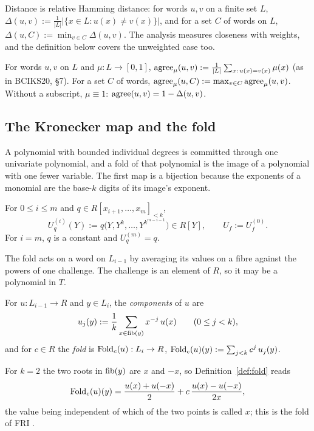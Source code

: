 Distance is relative Hamming distance: for words $u,v$ on a finite set $L$,
$\Delta(u,v):=\frac1{|L|}|\{x\in L:u(x)\ne v(x)\}|$, and for a set $C$ of words on $L$,
$\Delta(u,C):=\min_{v\in C}\Delta(u,v)$. The analysis measures closeness with weights, and the
definition below covers the unweighted case too.

{\sloppy
\begin{definition}\label{def:agree}
For words $u,v$ on $L$ and $\mu:L\to[0,1]$,
$\mathrm{agree}_\mu(u,v):=\frac1{|L|}\sum_{x:\,u(x)=v(x)}\mu(x)$ (as in BCIKS20, \S7). For a set
$C$ of words, $\mathrm{agree}_\mu(u,C):=\max_{v\in C}\mathrm{agree}_\mu(u,v)$. Without a subscript,
$\mu\equiv1$: $\mathrm{agree}(u,v)=1-\Delta(u,v)$.
\end{definition}\par}

\subsection{The Kronecker map and the fold}\label{sec:kron-prelim}

A polynomial with bounded individual degrees is committed through one univariate polynomial,
and a fold of that polynomial is the image of a polynomial with one fewer variable. The
first map is a bijection because the exponents of a monomial are the base-$k$ digits of its
image's exponent.

\begin{definition}\label{def:kron}
For $0\le i\le m$ and $q\in R[x_{i+1},\dots,x_m]_{<k}$,
\[
U^{(i)}_q(Y):=q\big(Y,Y^{k},\dots,Y^{k^{m-i-1}}\big)\in R[Y],\qquad U_f:=U^{(0)}_f .
\]
For $i=m$, $q$ is a constant and $U^{(m)}_q=q$.
\end{definition}

The fold acts on a word on $L_{i-1}$ by averaging its values on a fibre against the powers
of one challenge. The challenge is an element of $R$, so it may be a polynomial in $T$.

\begin{definition}[Fold]\label{def:fold}
For $u:L_{i-1}\to R$ and $y\in L_i$, the \emph{components} of $u$ are
\[
u_j(y):=\frac1k\sum_{x\in\mathrm{fib}(y)}x^{-j}\,u(x)\qquad(0\le j<k),
\]
and for $c\in R$ the \emph{fold} is $\mathrm{Fold}_c(u):L_i\to R$,
$\mathrm{Fold}_c(u)(y):=\sum_{j<k}c^j\,u_j(y)$.
\end{definition}

For $k=2$ the two roots in $\mathrm{fib}(y)$ are $x$ and $-x$, so Definition~\ref{def:fold} reads
\[
\mathrm{Fold}_c(u)(y)=\frac{u(x)+u(-x)}{2}+c\,\frac{u(x)-u(-x)}{2x},
\]
the value being independent of which of the two points is called $x$; this is the fold of
FRI \cite{BBHR18}.

